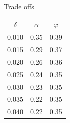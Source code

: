 Trade offs \\ 
\begin{tabular}{ccc} 
\hline 
$\delta$ & $\alpha$ & $\varphi$ \\ 
0.010 & 0.35 & 0.39 \\ 
0.015 & 0.29 & 0.37 \\ 
0.020 & 0.26 & 0.36 \\ 
0.025 & 0.24 & 0.35 \\ 
0.030 & 0.23 & 0.35 \\ 
0.035 & 0.22 & 0.35 \\ 
0.040 & 0.22 & 0.35 \\ 
\hline 
\end{tabular} 
